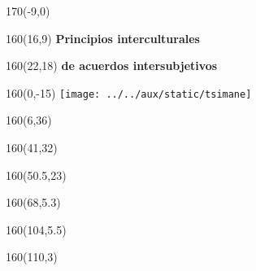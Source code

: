 \documentclass[shownotes,aspectratio=169]{beamer}
\begin{document}
\begin{frame}
\begin{textblock}{170}(-9,0)
\end{textblock}

\begin{textblock}{160}(16,9)
\LARGE \textcolor{black!5}{\fontsize{22}{0}\selectfont \textbf{Principios interculturales}}
\end{textblock}
\begin{textblock}{160}(22,18)
\LARGE \textcolor{black!5}{\fontsize{22}{0}\selectfont \textbf{de acuerdos intersubjetivos}}
\end{textblock}

\end{frame}

\begin{frame}

\begin{textblock}{160}(0,-15)
\texttt{[image: ../../aux/static/tsimane]}
\end{textblock}


\begin{textblock}{160}(6,36)
\LARGE {}
\end{textblock}
\begin{textblock}{160}(41,32)
\LARGE {}
\end{textblock}
\begin{textblock}{160}(50.5,23)
\LARGE {}
\end{textblock}
\begin{textblock}{160}(68,5.3)
\LARGE {}
\end{textblock}
\begin{textblock}{160}(104,5.5)
\LARGE {}
\end{textblock}
\begin{textblock}{160}(110,3)
\LARGE {}
\end{textblock}

\end{frame}
\end{document}
